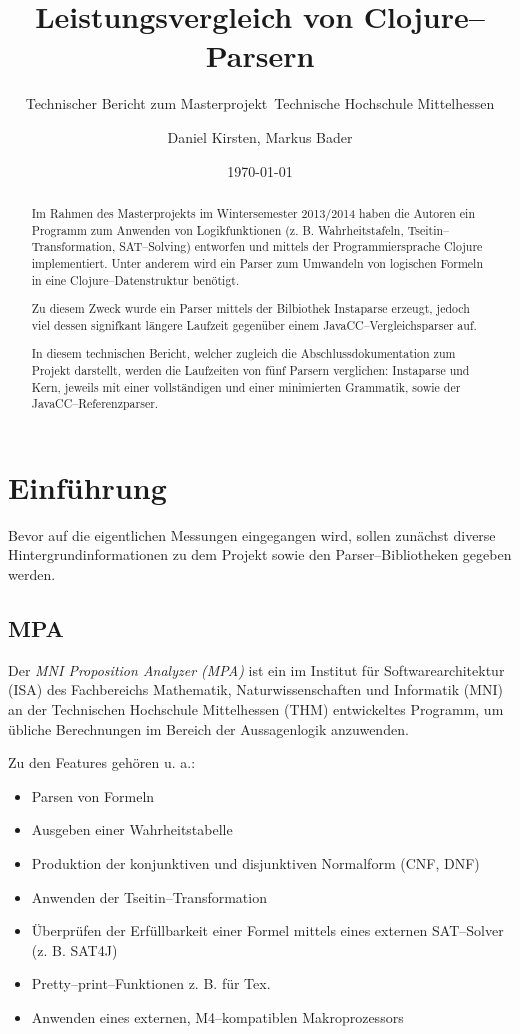 \documentclass[ngerman,a4paper,abstracton,open=right,twoside=false,toc=listofnumbered,bibtotocnumbered]{scrreprt}
\title{Leistungsvergleich von Clojure--Parsern}
\subtitle{Technischer Bericht zum Masterprojekt\
Technische Hochschule Mittelhessen}
\author{Daniel Kirsten, Markus Bader}
\date{\today}
\begin{document}
\lstset{
	language=Lisp,
	breaklines=true}

\maketitle
\newpage
\begin{abstract}

Im Rahmen des Masterprojekts im Wintersemester 2013/2014 haben die Autoren ein Programm zum Anwenden von Logikfunktionen (z. B. Wahrheitstafeln, Tseitin--Transformation, SAT--Solving) entworfen und mittels der Programmiersprache Clojure implementiert. Unter anderem wird ein Parser zum Umwandeln von logischen Formeln in eine Clojure--Datenstruktur benötigt.

Zu diesem Zweck wurde ein Parser mittels der Bilbiothek Instaparse erzeugt, jedoch viel dessen signifkant längere Laufzeit gegenüber einem JavaCC--Vergleichsparser auf.

In diesem technischen Bericht, welcher zugleich die Abschlussdokumentation zum Projekt darstellt, werden die Laufzeiten von fünf Parsern verglichen: Instaparse und Kern, jeweils mit einer vollständigen und einer minimierten Grammatik, sowie der JavaCC--Referenzparser.

\end{abstract}
\newpage
\tableofcontents
\newpage

\chapter{Einführung}

Bevor auf die eigentlichen Messungen eingegangen wird, sollen zunächst diverse Hintergrundinformationen zu dem Projekt sowie den Parser--Bibliotheken gegeben werden.

\section{MPA}

Der \emph{MNI Proposition Analyzer (MPA)} ist ein im Institut für Softwarearchitektur (ISA) des Fachbereichs Mathematik, Naturwissenschaften und Informatik (MNI) an der Technischen Hochschule Mittelhessen (THM) entwickeltes Programm, um übliche Berechnungen im Bereich der Aussagenlogik anzuwenden. \cite{mpa}

Zu den Features gehören u. a.:

\begin{itemize}
	\item Parsen von Formeln
	\item Ausgeben einer Wahrheitstabelle
	\item Produktion der konjunktiven und disjunktiven Normalform (CNF, DNF)
	\item Anwenden der Tseitin--Transformation
	\item Überprüfen der Erfüllbarkeit einer Formel mittels eines externen SAT--Solver (z. B. SAT4J)
	\item Pretty--print--Funktionen z. B. für Tex.
	\item Anwenden eines externen, M4--kompatiblen Makroprozessors
\end{itemize}
\end{document}
